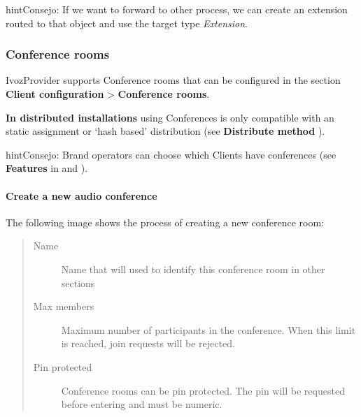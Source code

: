 \documentclass[letterpaper,10pt,spanish]{sphinxmanual}
\begin{document}
\begin{notice}{hint}{Consejo:}
If we want to forward to other process, we can create an extension
routed to that object and use the target type \emph{Extension}.
\end{notice}


\subsubsection{Conference rooms}
\label{administration_portal/client/vpbx/routing_endpoints/conference_rooms::doc}\label{administration_portal/client/vpbx/routing_endpoints/conference_rooms:conference-rooms}\label{administration_portal/client/vpbx/routing_endpoints/conference_rooms:id1}
IvozProvider supports Conference rooms that can be configured in the section
\textbf{Client configuration} \textgreater{} \textbf{Conference rooms}.

\textbf{In distributed installations} using Conferences is only compatible with an static
assignment or `hash based' distribution (see \textbf{Distribute method} {\hyperref[administration_portal/brand/clients/virtual_pbx:virtual\string-pbx]{}}).

\begin{notice}{hint}{Consejo:}
Brand operators can choose which Clients have conferences (see \textbf{Features}
in {\hyperref[getting_started/internal_calls/brand_portal:brand\string-configuration]{}} and {\hyperref[getting_started/internal_calls/client_portal:client\string-configuration]{}}).
\end{notice}
\paragraph{Create a new audio conference}

The following image shows the process of creating a new conference room:
\begin{quote}
\begin{description}
\item[{Name}] \leavevmode
Name that will used to identify this conference room in other sections

\item[{Max members}] \leavevmode
Maximum number of participants in the conference. When this limit is
reached, join requests will be rejected.

\item[{Pin protected}] \leavevmode
Conference rooms can be pin protected. The pin will be requested before
entering and must be numeric.

\end{description}
\end{quote}
\end{document}
